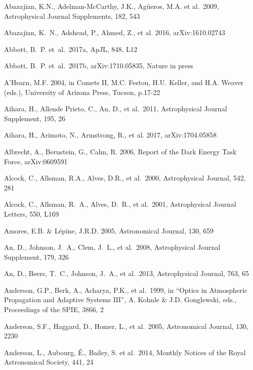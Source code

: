 \documentclass[twocolumn]{aastex61}
\begin{document}
\vskip 0.3in
\begin{thebibliography}{}

\bibitem[()]{} Abazajian, K.N., Adelman-McCarthy, J.K., Ag\"ueros,
  M.A. et al.~2009, Astrophysical Journal Supplements, 182, 543

\bibitem[()]{} Abazajian, K.~N., Adshead, P., Ahmed, Z., et al.	 2016, arXiv:1610.02743

\bibitem[()]{} Abbott, B.~P. et~al.~2017a, ApJL, 848, L12

\bibitem[()]{} Abbott, B.~P. et~al.~2017b, arXiv:1710.05835, Nature in press

\bibitem[()]{} A'Hearn, M.F. 2004, in Comets II, M.C. Festou, H.U. Keller, and H.A. Weaver (eds.),
             University of  Arizona Press, Tucson, p.17-22

\bibitem[()]{} Aihara, H., Allende Prieto, C., An, D., et al.~2011,
  Astrophysical Journal Supplement, 195, 26

\bibitem[()]{} Aihara, H.,  Arimoto, N., Armstrong, R., et al. 2017, arXiv:1704.05858


\bibitem[()]{} Albrecht, A., Bernstein, G., Cahn, R. 2006, Report of
  the Dark Energy Task Force, arXiv:0609591

\bibitem[()]{} Alcock, C., Allsman, R.A., Alves, D.R., et al.~2000, Astrophysical Journal, 542, 281

\bibitem[())]{} Alcock, C., Allsman, R.~A., Alves, D.~R., et al.\ 2001, Astrophysical Journal Letters, 550, L169

\bibitem[()]{} Amores, E.B. \& L\'{e}pine, J.R.D. 2005, Astronomical Journal, 130, 659

\bibitem[()]{} An, D., Johnson, J.~A., Clem, J.~L., et al.~2008, Astrophysical Journal Supplement, 179, 326

\bibitem[()]{} An, D., Beers, T.~C., Johnson, J.~A., et al.~2013, Astrophysical Journal, 763, 65

\bibitem[()]{} Anderson, G.P., Berk, A., Acharya, P.K., et al.~1999, in ``Optics in
             Atmospheric Propagation and Adaptive Systems III'',  A. Kohnle \& J.D. Gonglewski,
             eds., Proceedings of the SPIE, 3866, 2

\bibitem[()]{} Anderson, S.F., Haggard, D., Homer, L., et al.~2005, Astronomical Journal, 130, 2230

\bibitem[()]{} Anderson, L., Aubourg, \'E., Bailey, S. et al.~2014,
  Monthly Notices of the Royal Astronomical Society, 441, 24


\end{thebibliography}
\end{document}
